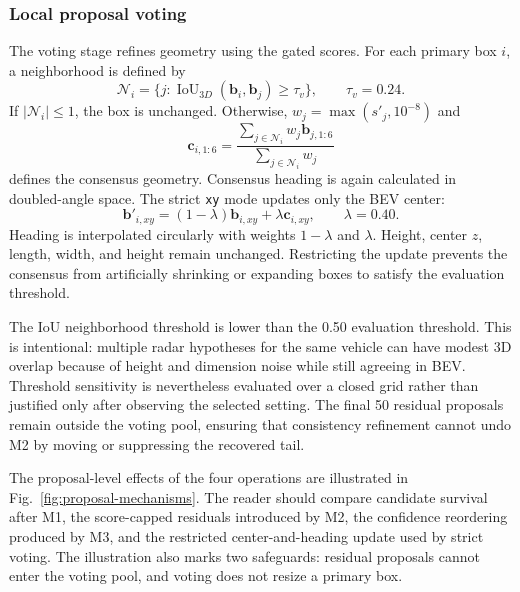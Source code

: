 \documentclass[final,5p,times]{elsarticle}
\newcommand{\figref}[1]{\textcolor{floatreviewblue}{Fig.~\ref{#1}}}
\newcommand{\figref}[1]{Fig.~\ref{#1}}
\begin{document}
\subsubsection{Local proposal voting}

The voting stage refines geometry using the gated scores. For each primary box
$i$, a neighborhood is defined by
\begin{equation}
\mathcal{N}_i=\{j:
\operatorname{IoU}_{3D}(\mathbf{b}_i,\mathbf{b}_j)\geq\tau_v\},
\qquad \tau_v=0.24.
\end{equation}
If $\lvert\mathcal{N}_i\rvert\leq1$, the box is unchanged. Otherwise,
$w_j=\max(s'_j,10^{-8})$ and
\begin{equation}
\mathbf{c}_{i,1:6}=
\frac{\sum_{j\in\mathcal{N}_i}w_j\mathbf{b}_{j,1:6}}
{\sum_{j\in\mathcal{N}_i}w_j}
\end{equation}
defines the consensus geometry. Consensus heading is again calculated in
doubled-angle space. The strict \texttt{xy} mode updates only the BEV center:
\begin{equation}
\mathbf{b}'_{i,xy}=(1-\lambda)\mathbf{b}_{i,xy}
+\lambda\mathbf{c}_{i,xy},
\qquad \lambda=0.40.
\label{eq:voting}
\end{equation}
Heading is interpolated circularly with weights $1-\lambda$ and $\lambda$.
Height, center $z$, length, width, and height remain unchanged. Restricting the
update prevents the consensus from artificially shrinking or expanding boxes
to satisfy the evaluation threshold.

The IoU neighborhood threshold is lower than the 0.50 evaluation threshold.
This is intentional: multiple radar hypotheses for the same vehicle can have
modest 3D overlap because of height and dimension noise while still agreeing
in BEV. Threshold sensitivity is nevertheless evaluated over a closed grid
rather than justified only after observing the selected setting. The final 50
residual proposals remain outside the voting pool, ensuring that consistency
refinement cannot undo M2 by moving or suppressing the recovered tail.

The proposal-level effects of the four operations are illustrated in
\figref{fig:proposal-mechanisms}. The reader should compare candidate survival
after M1, the score-capped residuals introduced by M2, the confidence
reordering produced by M3, and the restricted center-and-heading update used
by strict voting. The illustration also marks two safeguards: residual
proposals cannot enter the voting pool, and voting does not resize a primary
box.
\end{document}
